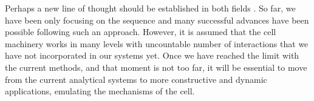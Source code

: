 Perhaps a new line of thought should be established in both fields \citep{claverie:2000a}. So far, we have been only 
focusing on the sequence and many successful advances have been possible following such an approach. However, it is assumed that 
the cell machinery works in many levels with uncountable number of interactions that we have not incorporated 
in our systems yet. Once we have reached the limit with the current methods, and that moment is not too far, it will be 
essential to move from the current analytical systems to more constructive and dynamic applications, emulating
the mechanisms of the cell.


{}
